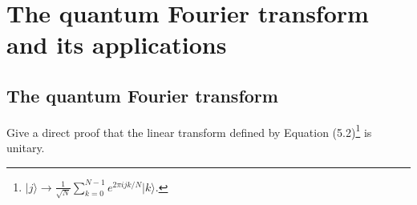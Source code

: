 \documentclass[en]{sol-man}
\begin{document}
\fi
\chapter{The quantum Fourier transform and its applications}

\section{The quantum Fourier transform}

\begin{exe}
    Give a direct proof that the linear transform defined by Equation (5.2)\footnote{$\lvert j\rangle\longrightarrow\frac{1}{\sqrt{N}}\sum_{k=0}^{N-1}e^{2\pi ijk/N}\lvert k\rangle$.} is unitary.
\end{exe}
\begin{pf}
    
\end{pf}

\ifx\allfiles\undefined
\end{document}

